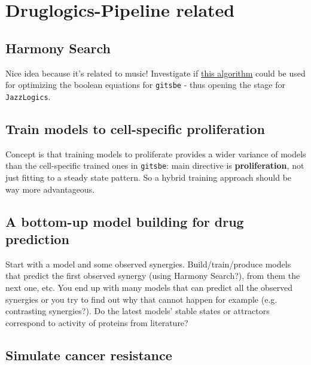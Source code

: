 \documentclass[
  12pt,
]{book}
\begin{document}
\hypertarget{druglogics-pipeline-related}{%
\section{Druglogics-Pipeline related}\label{druglogics-pipeline-related}}

\hypertarget{harmony-search}{%
\subsection{Harmony Search}\label{harmony-search}}

Nice idea because it's related to music!
Investigate if \href{https://doi.org/10.1016/j.proeng.2016.07.510}{this algorithm}
could be used for optimizing the boolean equations for \texttt{gitsbe} - thus opening the
stage for \texttt{JazzLogics}.

\hypertarget{train-models-to-cell-specific-proliferation}{%
\subsection{Train models to cell-specific proliferation}\label{train-models-to-cell-specific-proliferation}}

Concept is that training models to proliferate provides a wider variance of models than the
cell-specific trained ones in \texttt{gitsbe}: main directive is \textbf{proliferation},
not just fitting to a steady state pattern. So a hybrid training approach should
be way more advantageous.

\hypertarget{a-bottom-up-model-building-for-drug-prediction}{%
\subsection{A bottom-up model building for drug prediction}\label{a-bottom-up-model-building-for-drug-prediction}}

Start with a model and some observed synergies. Build/train/produce models that
predict the first observed synergy (using Harmony Search?), from them the next
one, etc. You end up with many models that can predict all the observed
synergies or you try to find out why that cannot happen for example (e.g.~
contrasting synergies?). Do the latest models' stable states or attractors
correspond to activity of proteins from literature?

\hypertarget{simulate-cancer-resistance}{%
\subsection{Simulate cancer resistance}\label{simulate-cancer-resistance}}
\end{document}
